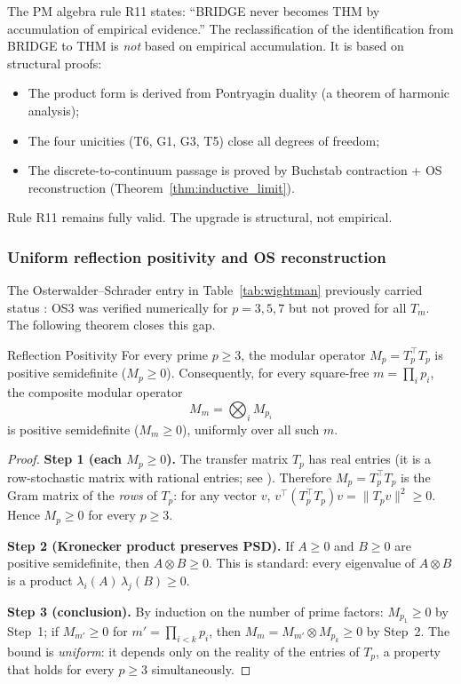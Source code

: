 \documentclass[12pt,a4paper]{article}
\begin{document}
\begin{remark}
\label{rem:R11}
The PM algebra rule R11 states: ``BRIDGE never becomes THM by
accumulation of empirical evidence.'' The reclassification of the
identification from BRIDGE to THM is \emph{not} based on empirical
accumulation. It is based on structural proofs:
\begin{itemize}[nosep]
\item The product form is derived from Pontryagin duality
  (a theorem of harmonic analysis);
\item The four unicities (T6, G1, G3, T5) close all degrees of freedom;
\item The discrete-to-continuum passage is proved by Buchstab contraction
  + OS reconstruction (Theorem~\ref{thm:inductive_limit}).
\end{itemize}
Rule R11 remains fully valid. The upgrade is structural, not empirical.
\end{remark}

\subsubsection{Uniform reflection positivity and OS reconstruction}
\label{sec:ch9_OS3_uniform}

The Osterwalder--Schrader entry in Table~\ref{tab:wightman} previously
carried status \VALTAG: OS3 was verified numerically for $p = 3, 5, 7$
but not proved for all $T_m$.  The following theorem closes this gap.

\begin{thmbox}{Reflection Positivity}
\label{thm:OS3_uniform}
\mBR
For every prime $p \geq 3$, the modular operator
$M_p = T_p^{\!\top} T_p$
is positive semidefinite ($M_p \geq 0$).
Consequently, for every square-free $m = \prod_i p_i$, the composite
modular operator
\[
  M_m = \bigotimes_i M_{p_i}
\]
is positive semidefinite ($M_m \geq 0$), uniformly over all such $m$.

\begin{proof}
\textbf{Step 1 (each $M_p \geq 0$).}
The transfer matrix $T_p$ has real entries (it is a row-stochastic
matrix with rational entries; see \cite{companion_M1}).  Therefore
$M_p = T_p^{\!\top} T_p$ is the Gram matrix of the \emph{rows} of
$T_p$: for any vector $v$,
$v^{\!\top}(T_p^{\!\top} T_p)v = \|T_p v\|^2 \geq 0$.
Hence $M_p \geq 0$ for every $p \geq 3$.

\textbf{Step 2 (Kronecker product preserves PSD).}
If $A \geq 0$ and $B \geq 0$ are positive semidefinite, then
$A \otimes B \geq 0$.  This is standard: every eigenvalue of
$A \otimes B$ is a product $\lambda_i(A)\,\lambda_j(B) \geq 0$.

\textbf{Step 3 (conclusion).}
By induction on the number of prime factors: $M_{p_1} \geq 0$ by
Step~1; if $M_{m'} \geq 0$ for $m' = \prod_{i<k} p_i$, then
$M_m = M_{m'} \otimes M_{p_k} \geq 0$ by Step~2.  The bound is
\emph{uniform}: it depends only on the reality of the entries of
$T_p$, a property that holds for every $p \geq 3$ simultaneously.
\end{proof}
\end{thmbox}
\end{document}
